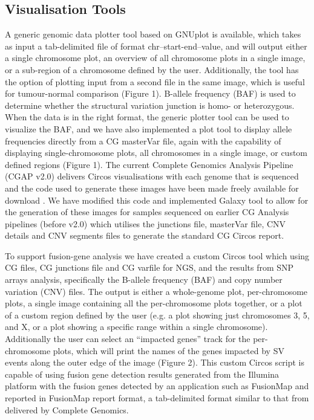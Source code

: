 \documentclass[10pt]{bmc_article}
\newenvironment{bmcformat}{\begin{raggedright}\baselineskip20pt\sloppy\setboolean{publ}{false}}{\end{raggedright}\baselineskip20pt\sloppy}
\begin{document}
\begin{bmcformat}
\subsection*{Visualisation Tools}
A generic genomic data plotter tool based on GNUplot is available, which takes as input a tab-delimited file of format chr–start-end–value, and will output either a single chromosome plot, an overview of all chromosome plots in a single image,  or a sub-region of a chromosome defined by the user. Additionally, the tool has the option of plotting input from a second file in the same image, which is useful for tumour-normal comparison (Figure 1). B-allele frequency (BAF) is used to determine whether the structural variation junction is homo- or heterozygous. When the data is in the right format, the generic plotter tool can be used to visualize the BAF, and we have also implemented a plot tool to display allele frequencies directly from a CG masterVar file, again with the capability of displaying single-chromosome plots, all chromosomes in a single image, or custom defined regions (Figure 1). The current Complete Genomics  Analysis Pipeline (CGAP v2.0) delivers Circos \cite{url-circos} visualisations with each genome that is sequenced and the code used to generate these images have been made freely available for download \cite{url-cgcircos}.  We have modified this code and implemented Galaxy tool to allow for the generation of these images for samples sequenced on earlier CG Analysis pipelines (before v2.0) which utilises the junctions file, masterVar file, CNV details and CNV segments files to generate the standard CG Circos report. 

To support fusion-gene analysis we have created a custom Circos tool which using CG files, CG junctions file and CG varfile for NGS, and the results from SNP arrays analysis, specifically the B-allele frequency (BAF) and copy number variation (CNV) files.  The output is either a whole-genome plot, per-chromosome plots, a single image containing all the per-chromosome plots together, or a plot of a custom region defined by the user (e.g. a plot showing just chromosomes 3, 5, and X, or a plot showing a specific range within a single chromosome).  Additionally the user can select an “impacted genes” track for the per-chromosome plots, which will print the names of the genes impacted by SV events along the outer edge of the image (Figure 2).  This custom Circos script is capable of using fusion gene detection results generated from the Illumina platform with the fusion genes detected by an application such as FusionMap \cite{fusionmap} and reported in FusionMap report format, a tab-delimited format similar to that from delivered by Complete Genomics. 


\end{bmcformat}
\end{document}
